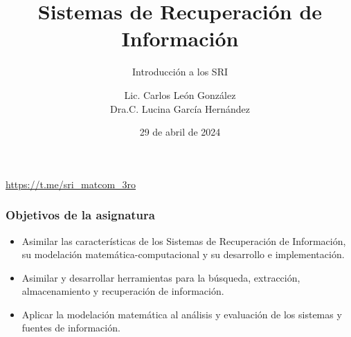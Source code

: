 \documentclass[
	10pt, %
	aspectratio=169, %
]{beamer}
\title[Short Title]{Sistemas de Recuperación de Información} %
\subtitle{Introducción a los SRI} %
\author{Lic. Carlos León González \\ Dra.C. Lucina García Hernández} %
\institute[UC]{Facultad de Matem\'atica y Computaci\'on \\ Universidad de La Habana \\ \smallskip } %
\date{29 de abril de  2024} %
\begin{document}


\begin{frame}
	\titlepage %
	
	\centering
	\url{https://t.me/sri_matcom_3ro}
\end{frame}


\begin{frame}
	
	\frametitle{Objetivos de la asignatura}
	
	\begin{itemize}
		
		\item Asimilar las características de los Sistemas de Recuperación de Información, su modelación matemática-computacional y su desarrollo e implementación. \\[4mm]
		
		\item Asimilar y desarrollar herramientas para la búsqueda, extracción, almacenamiento y recuperación de información. \\[4mm]
		
		\item Aplicar la modelación matemática al análisis y evaluación de los sistemas y fuentes de información.
		
	\end{itemize}
	
\end{frame}

\end{document}
